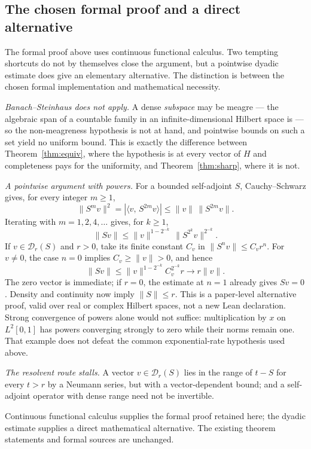 \documentclass[11pt]{article}
\theoremstyle{definition}
\newcommand{\inn}[2]{\langle #1,\, #2\rangle}
\begin{document}
\subsection*{The chosen formal proof and a direct alternative}
\label{rem:notelem}

The formal proof above uses continuous functional calculus.  Two tempting
shortcuts do not by themselves close the argument, but a pointwise dyadic
estimate does give an elementary alternative.  The distinction is between
the chosen formal implementation and mathematical necessity.

\smallskip\noindent\emph{Banach--Steinhaus does not apply.}  A dense
\emph{subspace} may be meagre --- the algebraic span of a countable
family in an infinite-dimensional Hilbert space is --- so
the non-meagreness hypothesis is not at hand, and pointwise bounds on such
a set yield no uniform bound.  This is exactly the difference between
Theorem~\ref{thm:equiv}, where the hypothesis is at every vector of $H$
and completeness pays for the uniformity, and Theorem~\ref{thm:sharp},
where it is not.

\smallskip\noindent\emph{A pointwise argument with powers.}
For a bounded self-adjoint $S$, Cauchy--Schwarz gives, for every integer $m\ge1$,
\[
  \|S^m v\|^2=|\inn{v}{S^{2m}v}|
       \le \|v\|\,\|S^{2m}v\|.
\]
Iterating with $m=1,2,4,\ldots$ gives, for $k\ge1$,
\[
  \|Sv\|\le \|v\|^{1-2^{-k}}\,
                    \|S^{2^k}v\|^{2^{-k}}.
\]
If $v\in\mathcal D_r(S)$ and $r>0$, take its finite constant $C_v$ in
$\|S^n v\|\le C_v r^n$.  For $v\ne0$, the case $n=0$ implies
$C_v\ge\|v\|>0$, and hence
\[
  \|Sv\|\le \|v\|^{1-2^{-k}}C_v^{2^{-k}}r
       \longrightarrow r\|v\|.
\]
The zero vector is immediate; if $r=0$, the estimate at $n=1$ already
gives $Sv=0$.  Density and continuity now imply $\|S\|\le r$.
This is a paper-level alternative proof, valid over real or complex
Hilbert spaces, not a new Lean declaration.  Strong convergence of powers
alone would not suffice: multiplication by $x$ on $L^2[0,1]$ has powers
converging strongly to zero while their norms remain one.  That example
does not defeat the common exponential-rate hypothesis used above.

\smallskip\noindent\emph{The resolvent route stalls.}  A vector
$v \in \mathcal{D}_r(S)$ lies in the range of $t - S$ for every $t > r$ by
a Neumann series, but with a vector-dependent bound; and a self-adjoint
operator with dense range need not be invertible.

\smallskip\noindent Continuous functional calculus supplies the formal
proof retained here; the dyadic estimate supplies a direct mathematical
alternative.  The existing theorem statements and formal sources are unchanged.
\end{document}
